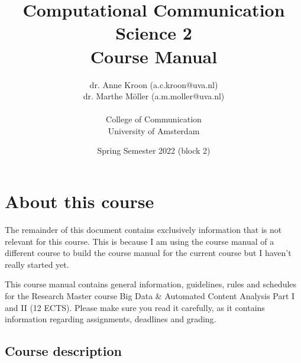 \documentclass[a4paper,10pt]{report}
\title{Computational Communication Science 2\\ Course Manual}
\author{dr. Anne Kroon (a.c.kroon@uva.nl)\\dr. Marthe Möller (a.m.moller@uva.nl) \\~\\College of Communication\\University of Amsterdam}
\date{Spring Semester 2022 (block 2)}
\begin{document}
	\maketitle
	
	
	
	\chapter{About this course}
	
	The remainder of this document contains exclusively information that is not relevant for this course. 
	This is because I am using the course manual of a different course to build the course manual for the current course but I haven't really started yet.
	
	This course manual contains general information, guidelines, rules and schedules for the Research Master course Big Data \& Automated Content Analysis Part I and II (12 ECTS). Please make sure you read it carefully, as it  contains information regarding assignments, deadlines and grading.
	
	\section{Course description}
	
%	
	
\end{document}
